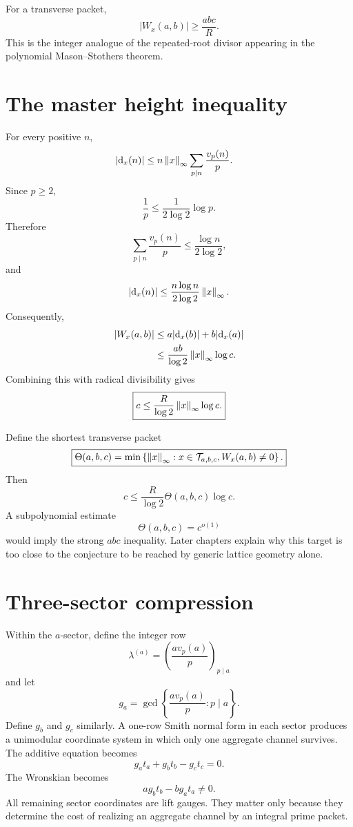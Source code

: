For a transverse packet,
\[
 \boxed{
 |W_x(a,b)|\ge\frac{abc}{R}.
 }
\]
This is the integer analogue of the repeated-root divisor appearing in the polynomial Mason--Stothers theorem.

\section{The master height inequality}
For every positive $n$,
\[
 \begin{aligned}
 |\mathrm d_x(n)|
 &\le
 n\left\lVert x\right\rVert_\infty
 \sum_{p\mid n}\frac{v_p(n)}p.
 \end{aligned}
\]
Since $p\ge2$,
\[
 \frac1p\le\frac1{2\log2}\log p.
\]
Therefore
\[
 \sum_{p\mid n}\frac{v_p(n)}p
 \le
 \frac{\log n}{2\log2},
\]
and
\[
 |\mathrm d_x(n)|
 \le
 \frac{n\log n}{2\log2}\left\lVert x\right\rVert_\infty.
\]
Consequently,
\[
 \begin{aligned}
 |W_x(a,b)|
 &\le
 a|\mathrm d_x(b)|+b|\mathrm d_x(a)|\\
 &\le
 \frac{ab}{\log2}\left\lVert x\right\rVert_\infty\log c.
 \end{aligned}
\]
Combining this with radical divisibility gives
\[
 \boxed{
 c
 \le
 \frac{R}{\log2}\left\lVert x\right\rVert_\infty\log c.
 }
\]

Define the shortest transverse packet
\[
 \boxed{
 \Theta(a,b,c)
 =
 \min\left\{
 \left\lVert x\right\rVert_\infty:
 x\in\mathcal T_{a,b,c},
 W_x(a,b)\neq0
 \right\}.
 }
\]
Then
\[
 c
 \le
 \frac{R}{\log2}\Theta(a,b,c)\log c.
\]
A subpolynomial estimate
\[
 \Theta(a,b,c)=c^{o(1)}
\]
would imply the strong $abc$ inequality. Later chapters explain why this target is too close to the conjecture to be reached by generic lattice geometry alone.

\section{Three-sector compression}
Within the $a$-sector, define the integer row
\[
 \lambda^{(a)}
 =
 \left(\frac{a v_p(a)}p\right)_{p\mid a}
\]
and let
\[
 g_a=\gcd\left\{\frac{a v_p(a)}p:p\mid a\right\}.
\]
Define $g_b$ and $g_c$ similarly. A one-row Smith normal form in each sector produces a unimodular coordinate system in which only one aggregate channel survives. The additive equation becomes
\[
 \boxed{
 g_at_a+g_bt_b-g_ct_c=0.
 }
\]
The Wronskian becomes
\[
 \boxed{
 a g_bt_b-b g_at_a\neq0.
 }
\]
All remaining sector coordinates are lift gauges. They matter only because they determine the cost of realizing an aggregate channel by an integral prime packet.

